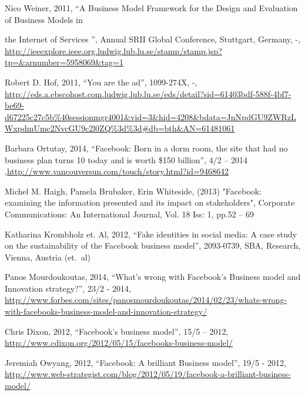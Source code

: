\documentclass[conference]{IEEEtran}
\begin{document}
\begin{thebibliography}{1}
Nico Weiner, 2011, “A Business Model Framework for the Design and Evaluation of
Business Models in 

the Internet of Services ”, Annual SRII Global Conference, Stuttgart, Germany,
-,
\href{http://ieeexplore.ieee.org.ludwig.lub.lu.se/stamp/stamp.jsp?tp=\&arnumber=5958069\&tag=1}{http://ieeexplore.ieee.org.ludwig.lub.lu.se/stamp/stamp.jsp?tp=\&arnumber=5958069\&tag=1}

Robert D. Hof, 2011, “You are the ad”, 1099-274X, -,
\href{http://eds.a.ebscohost.com.ludwig.lub.lu.se/eds/detail?sid=61403bdf-588f-4bf7-be69-d67225c27c5b\%40sessionmgr4001\&vid=3\&hid=4208\&bdata=JnNpdGU9ZWRzLWxpdmUmc2NvcGU9c2l0ZQ\%3d\%3d\#db=bth\&AN=61481061}{http://eds.a.ebscohost.com.ludwig.lub.lu.se/eds/detail?sid=61403bdf-588f-4bf7-be69-d67225c27c5b\%40sessionmgr4001\&vid=3\&hid=4208\&bdata=JnNpdGU9ZWRzLWxpdmUmc2NvcGU9c2l0ZQ\%3d\%3d\#db=bth\&AN=61481061}

Barbara Ortutay, 2014, “Facebook: Born in a dorm room, the site that had no
business plan turns 10 today and is worth \$150 billion”, 4/2 – 2014
,\href{http://www.vancouversun.com/touch/story.html?id=9468642}{http://www.vancouversun.com/touch/story.html?id=9468642}

Michel M. Haigh, Pamela Brubaker, Erin Whiteside, (2013) "Facebook: examining
the information presented and its impact on stakeholders", Corporate
Communications: An International Journal, Vol. 18 Iss: 1, pp.52 – 69

Katharina Krombholz et. Al, 2012, “Fake identities in social media: A case
study on the sustainability of the Facebook business model”, 2093-0739, SBA,
Research, Vienna, Austria (et.\ al)

Panos Mourdoukoutas, 2014, “What's wrong with Facebook's Business model and
Innovation strategy?”, 23/2 - 2014,
\href{http://www.forbes.com/sites/panosmourdoukoutas/2014/02/23/whats-wrong-with-facebooks-business-model-and-innovation-strategy/}{http://www.forbes.com/sites/panosmourdoukoutas/2014/02/23/whats-wrong-with-facebooks-business-model-and-innovation-strategy/}

Chris Dixon, 2012, “Facebook's business model”, 15/5 – 2012,
\href{http://www.cdixon.org/2012/05/15/facebooks-business-model/}{http://www.cdixon.org/2012/05/15/facebooks-business-model/}

Jeremiah Owyang, 2012, “Facebook: A brilliant Business model”, 19/5 - 2012,
\href{http://www.web-strategist.com/blog/2012/05/19/facebook-a-brilliant-business-model/}{http://www.web-strategist.com/blog/2012/05/19/facebook-a-brilliant-business-model/}


\end{thebibliography}
\end{document}

